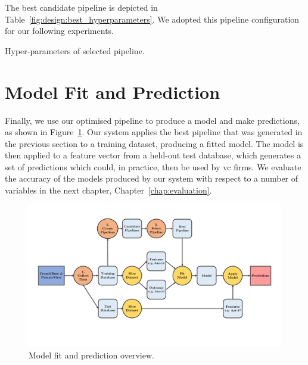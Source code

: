 \documentclass[../thesis/thesis.tex]{subfiles}
\begin{document}
The best candidate pipeline is depicted in Table~\ref{fig:design:best_hyperparameters}. We adopted this pipeline configuration for our following experiments.

\begin{table}[!htb]
    \centering
    \scalebox{0.8}{}
    \caption[Hyper-parameters of selected pipeline]{Hyper-parameters of selected pipeline.}
    \label{fig:design:best_hyperparameters}
\end{table}

\section{Model Fit and Prediction}

Finally, we use our optimised pipeline to produce a model and make predictions, as shown in Figure~\ref{fig:design:make_predictions}. Our system applies the best pipeline that was generated in the previous section to a training dataset, producing a fitted model. The model is then applied to a feature vector from a held-out test database, which generates a set of predictions which could, in practice, then be used by \gls{vc} firms. We evaluate the accuracy of the models produced by our system with respect to a number of variables in the next chapter, Chapter~\ref{chap:evaluation}.

\begin{figure}[!htb]
    \centering
    \includegraphics[width=\textwidth]{../figures/design/flowchart_make_predictions}
    \caption[Model fit and prediction flowchart]{Model fit and prediction overview.}
    \label{fig:design:make_predictions}
\end{figure}

\end{document}

